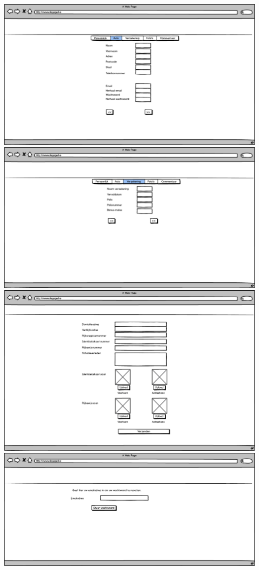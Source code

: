 \documentclass[]{article}
\begin{document}
\includegraphics[scale=0.4]{mockups/registratie_eigenaar_persoonlijk.png}
\includegraphics[scale=0.4]{mockups/registratie_eigenaar_verzekering.png}
\includegraphics[scale=0.4]{mockups/registratievervolledigen.png}
\includegraphics[scale=0.4]{mockups/wachtwoordvergeten.png}
\end{document}
